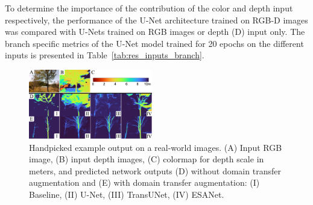 To determine the importance of the contribution of the color and depth input respectively, the performance of the U-Net architecture trained on RGB-D images was compared with U-Nets trained on RGB images or depth (D) input only. The branch specific metrics of the U-Net model trained for 20 epochs on the different inputs is presented in Table~\ref{tab:res_inputs_branch}. 


\begin{figure}[!hpt]
    \centering
    \includegraphics[width=0.48\textwidth]{figures/fig-6-qualtiative-real-comparison/fig-6-qualitative-real-comparison-half-v02.pdf}
    \caption{Handpicked example output on a real-world images. (A) Input RGB image, (B) input depth images, (C) colormap for depth scale in meters, and predicted network outputs (D) without domain transfer augmentation and (E) with domain transfer augmentation: (I) Baseline, (II) U-Net, (III) TransUNet, (IV) ESANet.}
    \label{fig:real_world_data}
    \vspace{-0.2cm}
\end{figure}

